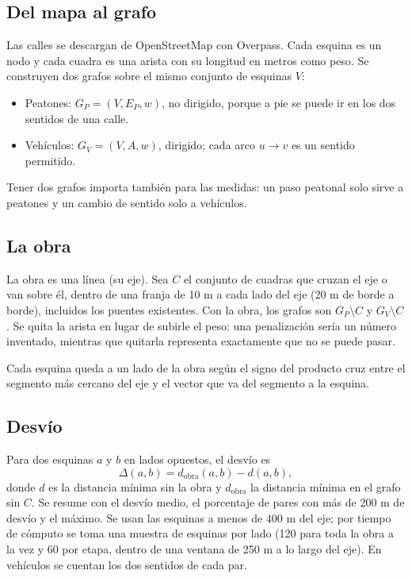 \documentclass[12pt,letterpaper]{article}
\begin{document}
\subsection{Del mapa al grafo}
Las calles se descargan de OpenStreetMap con Overpass. Cada esquina es un nodo y cada cuadra es una arista con su longitud en metros como peso. Se construyen dos grafos sobre el mismo conjunto de esquinas $V$:
\begin{itemize}
\item Peatones: $G_P=(V,E_P,w)$, no dirigido, porque a pie se puede ir en los dos sentidos de una calle.
\item Vehículos: $G_V=(V,A,w)$, dirigido; cada arco $u\to v$ es un sentido permitido.
\end{itemize}
Tener dos grafos importa también para las medidas: un paso peatonal solo sirve a peatones y un cambio de sentido solo a vehículos.

\subsection{La obra}
La obra es una línea (su eje). Sea $C$ el conjunto de cuadras que cruzan el eje o van sobre él, dentro de una franja de 10 m a cada lado del eje (20 m de borde a borde), incluidos los puentes existentes. Con la obra, los grafos son $G_P\setminus C$ y $G_V\setminus C$. Se quita la arista en lugar de subirle el peso: una penalización sería un número inventado, mientras que quitarla representa exactamente que no se puede pasar.

Cada esquina queda a un lado de la obra según el signo del producto cruz entre el segmento más cercano del eje y el vector que va del segmento a la esquina.

\subsection{Desvío}
Para dos esquinas $a$ y $b$ en lados opuestos, el desvío es
\begin{equation}
\Delta(a,b)=d_{\text{obra}}(a,b)-d(a,b),
\end{equation}
donde $d$ es la distancia mínima sin la obra y $d_{\text{obra}}$ la distancia mínima en el grafo sin $C$. Se resume con el desvío medio, el porcentaje de pares con más de 200 m de desvío y el máximo. Se usan las esquinas a menos de 400 m del eje; por tiempo de cómputo se toma una muestra de esquinas por lado (120 para toda la obra a la vez y 60 por etapa, dentro de una ventana de 250 m a lo largo del eje). En vehículos se cuentan los dos sentidos de cada par.
\end{document}
